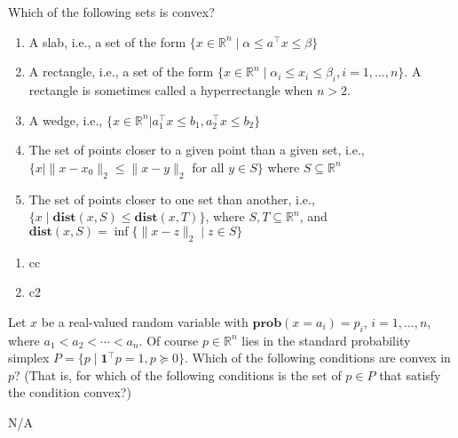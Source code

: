 \documentclass{llncs}
\begin{document}
\begin{problem}
Which of the following sets is convex?
\begin{enumerate}
    \item A slab, i.e., a set of the form $\{x \in \mathbb{R}^n \mid \alpha \le a^\top x \le \beta\}$
    \item A rectangle, i.e., a set of the form $\{ x \in \mathbb{R}^n \mid \alpha_i \le x_i \le \beta_i, i = 1, \ldots, n\}$. A rectangle is sometimes called a hyperrectangle when $n > 2$.
    \item A wedge, i.e., $\{x \in \mathbb{R}^n | a_1^\top x \le b_1, a_2^\top x \le b_2\}$
    \item The set of points closer to a given point than a given set, i.e., $\{ x \mid \|x - x_0\|_2 \le \|x - y \|_2$ for all $y \in S\}$ where $S \subseteq \mathbb{R}^n$
    \item The set of points closer to one set than another, i.e., $\{ x \mid \textbf{dist}(x, S) \le \textbf{dist}(x, T)\}$, where $S,T \subseteq \mathbb{R}^n$, and $\textbf{dist}(x,S) = \inf\{\|x - z\|_2 \mid z \in S\}$
\end{enumerate}
\end{problem}
\begin{solution} 
\newline
\begin{enumerate}
    \item cc
    \item c2
\end{enumerate}
\end{solution}

\begin{problem}
Let $x$ be a real-valued random variable with $\textbf{prob}(x = a_i) = p_i$, $i = 1, \ldots, n$, where $a_1 < a_2 < \cdots < a_n$. Of course $p \in \mathbb{R}^n$ lies in the standard probability simplex $P = \{ p \mid \mathbf{1}^\top p = 1, p \succeq 0\}$. Which of the following conditions are convex in $p$? (That is, for which of the following conditions is the set of $p \in P$ that satisfy the condition convex?)
\end{problem}
\begin{solution}
N/A
\end{solution}
\end{document}
